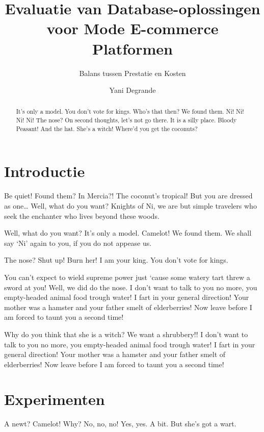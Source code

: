 \documentclass[a0,portrait]{hogent-poster}
\title{Evaluatie van Database-oplossingen voor Mode E-commerce Platformen}
\subtitle{Balans tussen Prestatie en Kosten}
\author{Yani Degrande}
\begin{document}
\maketitle

\begin{abstract}
It's only a model.
You don't vote for kings. Who's that then? We found them. Ni! Ni! Ni! Ni!
The nose? On second thoughts, let's not go there. It is a silly place. Bloody Peasant! And the hat. She's a witch! Where'd you get the coconuts?
\end{abstract}

\begin{multicols}{2} %

\section{Introductie}

Be quiet! Found them? In Mercia?! The coconut's tropical! But you are dressed as one… Well, what do you want? Knights of Ni, we are but simple travelers who seek the enchanter who lives beyond these woods.

Well, what do you want? It's only a model. Camelot! We found them. We shall say `Ni' again to you, if you do not appease us.

The nose? Shut up! Burn her! I am your king. You don't vote for kings.

You can't expect to wield supreme power just `cause some watery tart threw a sword at you! Well, we did do the nose. I don't want to talk to you no more, you empty-headed animal food trough water! I fart in your general direction! Your mother was a hamster and your father smelt of elderberries! Now leave before I am forced to taunt you a second time!

Why do you think that she is a witch? We want a shrubbery!! I don't want to talk to you no more, you empty-headed animal food trough water! I fart in your general direction! Your mother was a hamster and your father smelt of elderberries! Now leave before I am forced to taunt you a second time!

\section{Experimenten}

A newt? Camelot! Why? No, no, no! Yes, yes. A bit. But she's got a wart.


\end{multicols}
\end{document}
